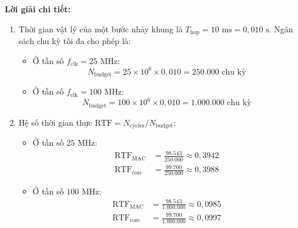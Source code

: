 \noindent\textbf{Lời giải chi tiết:}
\begin{enumerate}[label=\alph*)]
    \item Thời gian vật lý của một bước nhảy khung là $T_{\text{hop}} = 10\text{ ms} = 0{,}010\text{ s}$. Ngân sách chu kỳ tối đa cho phép là:
    \begin{itemize}[leftmargin=1.5em, itemsep=2pt]
        \item Ở tần số $f_{\text{clk}} = 25\text{ MHz}$:
        \begin{equation}
            N_{\text{budget}} = 25 \times 10^6 \times 0{,}010 = 250.000\text{ chu kỳ}
        \end{equation}
        \item Ở tần số $f_{\text{clk}} = 100\text{ MHz}$:
        \begin{equation}
            N_{\text{budget}} = 100 \times 10^6 \times 0{,}010 = 1.000.000\text{ chu kỳ}
        \end{equation}
    \end{itemize}

    \item Hệ số thời gian thực $\text{RTF} = N_{\text{cycles}} / N_{\text{budget}}$:
    \begin{itemize}[leftmargin=1.5em, itemsep=2pt]
        \item Ở tần số $25\text{ MHz}$:
        \begin{align}
            \text{RTF}_{\text{MAC}} &= \frac{98.543}{250.000} \approx 0{,}3942 \\
            \text{RTF}_{\text{core}} &= \frac{99.700}{250.000} \approx 0{,}3988
        \end{align}
        \item Ở tần số $100\text{ MHz}$:
        \begin{align}
            \text{RTF}_{\text{MAC}} &= \frac{98.543}{1.000.000} \approx 0{,}0985 \\
            \text{RTF}_{\text{core}} &= \frac{99.700}{1.000.000} \approx 0{,}0997
        \end{align}
    \end{itemize}


\end{enumerate}

